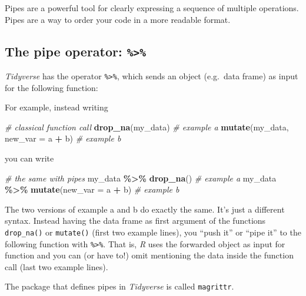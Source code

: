 \documentclass[
]{scrartcl}
\makeatletter
\newenvironment{Shaded}{\begin{snugshade}}{\end{snugshade}}
\newcommand{\CommentTok}[1]{\textcolor[rgb]{0.56,0.35,0.01}{\textit{#1}}}
\newcommand{\DataTypeTok}[1]{\textcolor[rgb]{0.13,0.29,0.53}{#1}}
\newcommand{\KeywordTok}[1]{\textcolor[rgb]{0.13,0.29,0.53}{\textbf{#1}}}
\newcommand{\NormalTok}[1]{#1}
\newcommand{\OperatorTok}[1]{\textcolor[rgb]{0.81,0.36,0.00}{\textbf{#1}}}
\newcommand{\StringTok}[1]{\textcolor[rgb]{0.31,0.60,0.02}{#1}}
\newenvironment{kframe}{%
\medskip{}
\setlength{\fboxsep}{.8em}
 \def\at@end@of@kframe{}%
 \ifinner\ifhmode%
  \def\at@end@of@kframe{\end{minipage}}%
  \begin{minipage}{\columnwidth}%
 \fi\fi%
 \def\FrameCommand##1{\hskip\@totalleftmargin \hskip-\fboxsep
 \colorbox{shadecolor}{##1}\hskip-\fboxsep
     \hskip-\linewidth \hskip-\@totalleftmargin \hskip\columnwidth}%
 \MakeFramed {\advance\hsize-\width
   \@totalleftmargin\z@ \linewidth\hsize
   \@setminipage}}%
 {\par\unskip\endMakeFramed%
 \at@end@of@kframe}
\newenvironment{rmdblock}[1]
  {
  \begin{itemize}
  \renewcommand{\labelitemi}{
    \raisebox{-.7\height}[0pt][0pt]{
      {\setkeys{Gin}{width=3em,keepaspectratio}\texttt{[image: images/\#1]}}
    }
  }
  \setlength{\fboxsep}{1em}
  \begin{kframe}
  \item
  }
  {
  \end{kframe}
  \end{itemize}
  }
\newenvironment{geek}
    {\begin{rmdblock}{geek}}
    {\end{rmdblock}}
\makeatother
\begin{document}
Pipes are a powerful tool for clearly expressing a sequence of multiple operations. Pipes are a way to order your code in a more readable format.

\hypertarget{the-pipe-operator}{%
\subsection{\texorpdfstring{The pipe operator: \texttt{\%\textgreater{}\%}}{The pipe operator: \%\textgreater\%}}\label{the-pipe-operator}}

\emph{Tidyverse} has the operator \texttt{\%\textgreater{}\%}, which sends an object (e.g.~data frame) as input for the following function:

For example, instead writing

\begin{Shaded}
\begin{Highlighting}[]
\CommentTok{\# classical function call}
\KeywordTok{drop\_na}\NormalTok{(my\_data)                }\CommentTok{\# example a}
\KeywordTok{mutate}\NormalTok{(my\_data, }\DataTypeTok{new\_var =}\NormalTok{ a }\OperatorTok{+}\StringTok{ }\NormalTok{b) }\CommentTok{\# example b}
\end{Highlighting}
\end{Shaded}

you can write

\begin{Shaded}
\begin{Highlighting}[]
\CommentTok{\# the same with pipes}
\NormalTok{my\_data }\OperatorTok{\%\textgreater{}\%}\StringTok{ }\KeywordTok{drop\_na}\NormalTok{()                }\CommentTok{\# example a}
\NormalTok{my\_data }\OperatorTok{\%\textgreater{}\%}\StringTok{ }\KeywordTok{mutate}\NormalTok{(}\DataTypeTok{new\_var =}\NormalTok{ a }\OperatorTok{+}\StringTok{ }\NormalTok{b)  }\CommentTok{\# example b}
\end{Highlighting}
\end{Shaded}

The two versions of example a and b do exactly the same. It's just a different syntax. Instead having the data frame as first argument of the functions \texttt{drop\_na()} or \texttt{mutate()} (first two example lines), you ``push it'' or ``pipe it'' to the following function with \texttt{\%\textgreater{}\%}. That is, \emph{R} uses the forwarded object as input for function and you can (or have to!) omit mentioning the data inside the function call (last two example lines).

\begin{geek}
The package that defines pipes in \emph{Tidyverse} is called
\texttt{magrittr}.
\end{geek}
\end{document}

